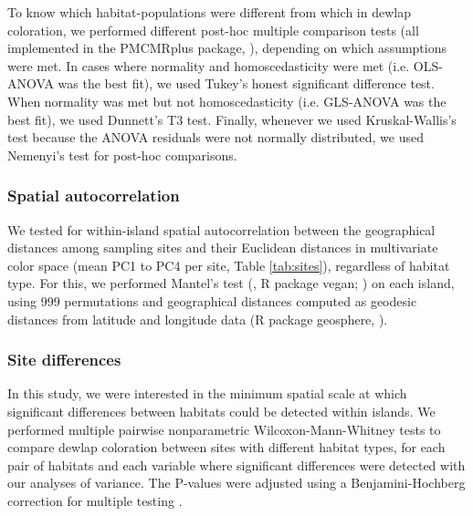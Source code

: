 To know which habitat-populations were different from which in dewlap coloration, we performed different post-hoc multiple comparison tests (all implemented in the PMCMRplus package, \citealp{Pohlert2020}), depending on which assumptions were met. In cases where normality and homoscedasticity were met (i.e. OLS-ANOVA was the best fit), we used Tukey's honest significant difference test. When normality was met but not homoscedasticity (i.e. GLS-ANOVA was the best fit), we used Dunnett's T3 test. Finally, whenever we used Kruskal-Wallis's test because the ANOVA residuals were not normally distributed, we used Nemenyi's test for post-hoc comparisons.

\subsubsection*{Spatial autocorrelation}

We tested for within-island spatial autocorrelation between the geographical distances among sampling sites and their Euclidean distances in multivariate color space (mean PC1 to PC4 per site, Table \ref{tab:sites}), regardless of habitat type. For this, we performed Mantel's test (\citealt{Legendre2012}, R package vegan; \citealt{Oksanen2019}) on each island, using 999 permutations and geographical distances computed as geodesic distances from latitude and longitude data (R package geosphere, \citealt{Hijmans2019}).\\ 

\subsubsection*{Site differences}

In this study, we were interested in the minimum spatial scale at which significant differences between habitats could be detected within islands. We performed multiple pairwise nonparametric Wilcoxon-Mann-Whitney tests \citep{Hollander2013} to compare dewlap coloration between sites with different habitat types, for each pair of habitats and each variable where significant differences were detected with our analyses of variance. The P-values were adjusted using a Benjamini-Hochberg correction for multiple testing \citep{Benjamini1995}.